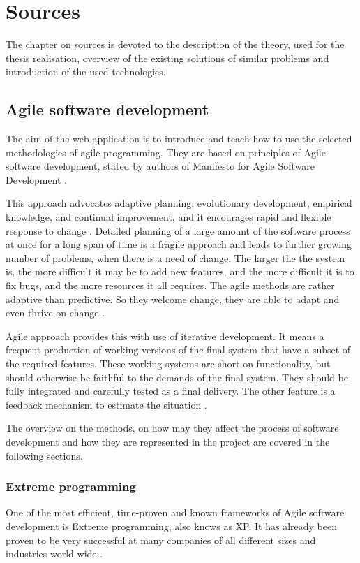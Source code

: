 \chapter{Sources}
\label{ch:sources}
The chapter on sources is devoted to the description of the theory, used for the thesis realisation, overview of the existing solutions of similar problems and introduction of the used technologies.

\section{Agile software development}
The aim of the web application is to introduce and teach how to use the selected methodologies of agile programming. They are based on principles of Agile software development, stated by authors of Manifesto for Agile Software Development \cite{manifesto}.

This approach advocates adaptive planning, evolutionary development, empirical knowledge, and continual improvement, and it encourages rapid and flexible response to change \cite{swdev}. Detailed planning of a large amount of the software process at once for a long span of time is a fragile approach and leads to further growing number of problems, when there is a need of change. The larger the the system is, the more difficult it may be to add new features, and the more difficult it is to fix bugs, and the more resources it all requires. The agile methods are rather adaptive than predictive. So they welcome change, they are able to adapt and even thrive on change \cite[From Nothing, to Monumental, to Agile]{agile_fowler}.

Agile approach provides this with use of iterative development. It means a frequent production of working versions of the final system that have a subset of the required features. These working systems are short on functionality, but should otherwise be faithful to the demands of the final system. They should be fully integrated and carefully tested as a final delivery. The other feature is a feedback mechanism to estimate the situation \cite[Controlling an Unpredictable Process - Iterations]{agile_fowler}. 

The overview on the methods, on how may they affect the process of software development and how they are represented in the project are covered in the following sections.

\subsection{Extreme programming}
One of the most efficient, time-proven and known frameworks of Agile software development is Extreme programming, also knows as XP. It has already been proven to be very successful at many companies of all different sizes and industries world wide \cite{xp_intro}.

